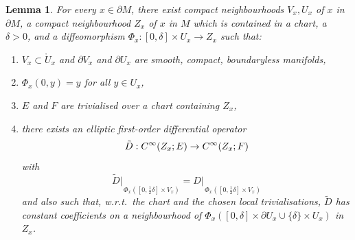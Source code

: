 \documentclass[a4paper,10pt,reqno]{amsart}
\newcommand{\rest}[1]{{{\lvert_{}}_{}}_{#1}}
\newcommand{\interior}[1]{\mathring{#1}}
\newcommand{\Ck}[2][{}]{{\rm C}^{#2}_{\rm #1}}%
\newtheorem{lemma}[theorem]{Lemma}
\theoremstyle{definition}
\begin{document}
\begin{lemma}
\label{Lem:ExtOp}
For every $x \in \partial M$, there exist compact neighbourhoods $V_x, U_x$ of $x$ in $\partial M$, a compact neighbourhood $Z_x$ of $x$ in $M$ which is contained in a chart, a $\delta > 0$, and a diffeomorphism $\Phi_x: [0, \delta] \times U_x \to Z_x$ such that:
\begin{enumerate}[label=(\roman*), labelwidth=0pt, labelindent=2pt, leftmargin=21pt]
\item \label{Lem:ExtOp:1} $V_x\subset\interior{U}_x$ and $\partial V_x$ and $\partial U_x$ are smooth, compact, boundaryless manifolds,
\item \label{Lem:ExtOp:2} $\Phi_x(0,y) = y$ for all $y\in U_x$,
\item \label{Lem:ExtOp:3} $E$ and $F$ are trivialised over a chart containing $Z_x$,
\item \label{Lem:ExtOp:4} there exists an elliptic first-order differential operator
      $$\tilde{D}: \Ck{\infty}(Z_x; E) \to \Ck{\infty}(Z_x; F)$$
      with
      $$ \tilde{D} \rest{\Phi_x([0,\frac12 \delta] \times V_x)} = D \rest{\Phi_x([0,\frac12 \delta] \times V_x)}$$
      and also such that, w.r.t.\ the chart and the chosen local trivialisations, $\tilde{D}$ has constant coefficients on a neighbourhood of $\Phi_x([0,\delta]\times\partial U_x \cup \{\delta\}\times U_x)$ in $Z_x$.
\end{enumerate}
\end{lemma}
\end{document}

